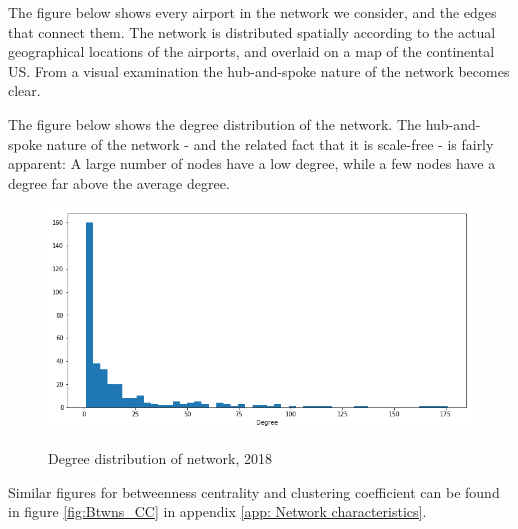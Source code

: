 The figure below shows every airport in the network we consider, and the edges that connect them. The network is distributed spatially according to the actual geographical locations of the airports, and overlaid on a map of the continental US. From a visual examination the hub-and-spoke nature of the network becomes clear.

The figure below shows the degree distribution of the network. The hub-and-spoke nature of the network - and the related fact that it is scale-free - is fairly apparent: A large number of nodes have a low degree, while a few nodes have a degree far above the average degree. 
\begin{figure}[H]
  \centering
  \caption{Degree distribution of network, 2018}
    \includegraphics[width=0.6 \textwidth]{Exam/Figures/degreeDistribution.png}
  \label{fig:degreeDistribution}
\end{figure}
Similar figures for betweenness centrality and clustering coefficient can be found in figure \ref{fig:Btwns_CC} in appendix \ref{app: Network characteristics}. 

